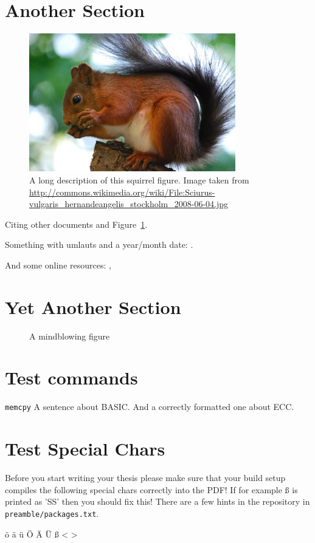 \section{Another Section}

\begin{figure}[tbp]
    \centering
    \includegraphics[width=0.8\textwidth]{images/squirrel}
    \caption[Short description]{A long description of this squirrel figure.
        Image taken from
        \url{http://commons.wikimedia.org/wiki/File:Sciurus-vulgaris_hernandeangelis_stockholm_2008-06-04.jpg}}
    \label{fig:squirrel}
\end{figure}

Citing \cite{bellard2005qfa} other documents \cite{bellard2005qfa, boileau06}
and Figure~\ref{fig:squirrel}.

Something with umlauts and a year/month date:
\cite{becher04:_feurig_hacken_mit_firew}.

And some online resources: \cite{green04}, \cite{patent:4819234}


\section{Yet Another Section}


\begin{figure}[tbp]
    \caption{A mindblowing figure}
    \label{fig:todo}
\end{figure}

\section{Test commands}

\drops \LLinux \NOVA \QEMU
\texttt{memcpy}
A sentence about BASIC. And a correctly formatted one about ECC\@.

\section{Test Special Chars}
Before you start writing your thesis please make sure that your build setup
compiles the following special chars correctly into the PDF!
If for example ß is printed as 'SS' then you should fix this!
There are a few hints in the repository in \mbox{\texttt{preamble/packages.txt}}.

ö ä ü Ö Ä Ü ß < >


\cleardoublepage

